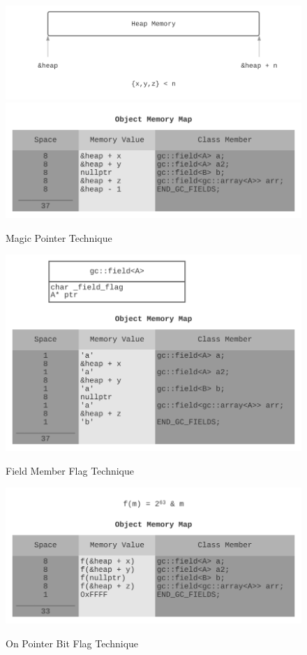 \documentclass[11pt]{article}
\begin{document}
\begin{figure}
\begin{center}
\includegraphics[scale=0.5]{./report_srcs/heap_memory_only.png}
\includegraphics[scale=0.5]{./report_srcs/magic_pointer_technique.png}
\caption{Magic Pointer Technique}
\label{fig:mark:magicpointer}
\includegraphics[scale=0.5]{./report_srcs/field_member_flag_technique.png}
\caption{Field Member Flag Technique}
\label{fig:mark:fieldmemberflag}
\includegraphics[scale=0.5]{./report_srcs/on_pointer_bit_flag_technique.png}
\caption{On Pointer Bit Flag Technique}
\label{fig:mark:onpointerflag}
\end{center}
\end{figure}
\end{document}
